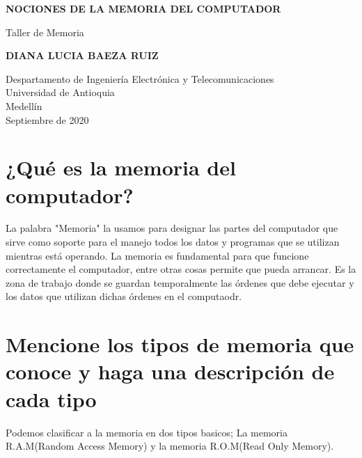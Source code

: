 \documentclass{article}
\begin{document}
\begin{titlepage}
    \begin{center}
        \vspace*{1cm}
            
        \Huge
        \textbf{NOCIONES DE LA MEMORIA DEL COMPUTADOR}
            
        \vspace{0.5cm}
        \LARGE
        Taller de Memoria
            
        \vspace{1.5cm}
            
        \textbf{DIANA LUCIA BAEZA RUIZ}
            
        \vfill
            
        \vspace{0.8cm}
            
        \Large
        Despartamento de Ingeniería Electrónica y Telecomunicaciones\\
        Universidad de Antioquia\\
        Medellín\\
        Septiembre de 2020
            
    \end{center}
\end{titlepage}

\tableofcontents


\section{¿Qué es la memoria del computador?} \label{contenido}

La palabra "Memoria" la usamos para designar las partes del computador que sirve como soporte para el manejo todos los datos y programas que se utilizan mientras está operando. La memoria es fundamental para que funcione correctamente el computador, entre otras cosas permite que pueda arrancar.
Es la zona de trabajo donde se guardan temporalmente las órdenes que debe ejecutar y los datos que utilizan dichas órdenes en el computaodr.\cite{1website}

\section{Mencione los tipos de memoria que conoce y haga una descripción de cada tipo}

Podemos clasificar a la memoria en dos tipos basicos; La memoria R.A.M(Random Access Memory) y la memoria R.O.M(Read Only Memory).
\end{document}
